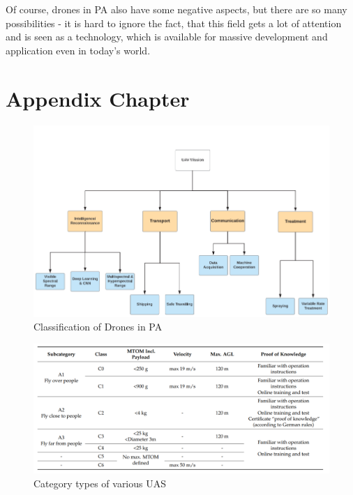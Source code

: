 \documentclass[11pt,a4paper,footinclude=true,headinclude=true, oneside]{scrbook}
\begin{document}
Of course, drones in PA also have some negative aspects, but there are so many possibilities - it is hard to ignore the fact, that this field gets a lot of attention and is seen as a technology, which is available for massive development and application even in today's world.

\chapter{Appendix Chapter}
    
\begin{figure}[htbp]
\centerline{\includegraphics[scale=.7]{Drone_Groups.png}}
\caption{Classification of Drones in PA \cite{Bacco_Smart_2018}}
\label{dronegroup}
\end{figure}

\begin{figure}[htbp]
\centerline{\includegraphics[scale=.5]{Drone_Safety_Categories.png}}
\caption{Category types of various UAS \cite{alamouri_exploratory_2021}}
\label{categories}
\end{figure}
\end{document}
